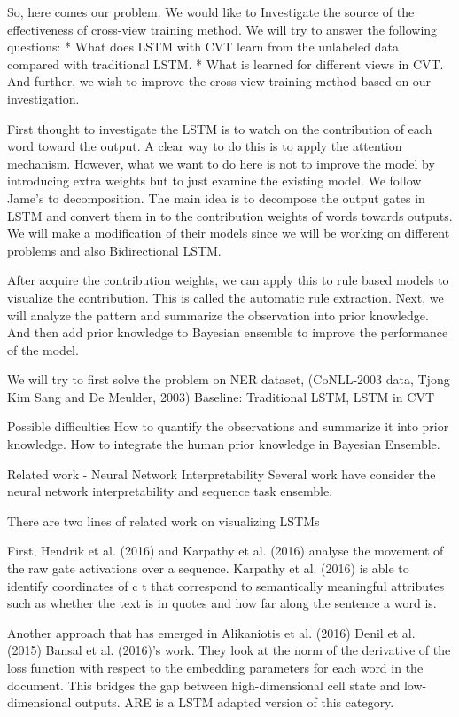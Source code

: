 \documentclass{article}
\begin{document}
So, here comes our problem. We would like to Investigate the source of the effectiveness of cross-view training method. We will try to answer the following questions: * What does LSTM with CVT learn from the unlabeled data compared with traditional LSTM. * What is learned for different views in CVT.  And further, we wish to improve the cross-view training method based on our investigation.

First thought to investigate the LSTM is to watch on the contribution of each word toward the output. A clear way to do this is to apply the attention mechanism. However, what we want to do here is not to improve the model by introducing extra weights but to just examine the existing model. We follow Jame’s to decomposition. The main idea is to decompose the output gates in LSTM and convert them in to the contribution weights of words towards outputs. We will make a modification of their models since we will be working on different problems and also Bidirectional LSTM.

After acquire the contribution weights, we can apply this to rule based models to visualize the contribution. This is called the automatic rule extraction.
Next, we will analyze the pattern and summarize the observation into prior knowledge. And then add prior knowledge to Bayesian ensemble to improve the performance of the model.

We will try to first solve the problem on NER dataset, (CoNLL-2003 data, Tjong Kim Sang and De Meulder, 2003)
Baseline: Traditional LSTM, LSTM in CVT

Possible difficulties
How to quantify the observations and summarize it into prior knowledge.
How to integrate the human prior knowledge in Bayesian Ensemble.

Related work - Neural Network Interpretability
Several work have consider the neural network interpretability and sequence task ensemble.

There are two lines of related work on visualizing LSTMs

First, Hendrik et al. (2016) and Karpathy et al. (2016) analyse the movement of the raw gate activations over a sequence. Karpathy et al. (2016) is able to identify coordinates of c t that correspond to semantically meaningful attributes such as whether the text is in quotes and how far along the sentence a word is.

Another approach that has emerged in Alikaniotis et al. (2016) Denil et al. (2015) Bansal et al. (2016)’s work. They look at the norm of the derivative of the loss function with respect to the embedding parameters for each word in the document. This bridges the gap between high-dimensional cell state and low-dimensional outputs.
ARE is a LSTM adapted version of this category.
\end{document}
